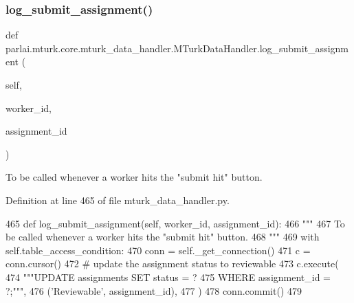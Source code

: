 \subsubsection{\texorpdfstring{log\+\_\+submit\+\_\+assignment()}{log\_submit\_assignment()}}
{\footnotesize\ttfamily def parlai.\+mturk.\+core.\+mturk\+\_\+data\+\_\+handler.\+M\+Turk\+Data\+Handler.\+log\+\_\+submit\+\_\+assignment (\begin{DoxyParamCaption}\item[{}]{self,  }\item[{}]{worker\+\_\+id,  }\item[{}]{assignment\+\_\+id }\end{DoxyParamCaption})}

\begin{DoxyVerb}To be called whenever a worker hits the "submit hit" button.
\end{DoxyVerb}
 

Definition at line 465 of file mturk\+\_\+data\+\_\+handler.\+py.


\begin{DoxyCode}
465     \textcolor{keyword}{def }log\_submit\_assignment(self, worker\_id, assignment\_id):
466         \textcolor{stringliteral}{"""}
467 \textcolor{stringliteral}{        To be called whenever a worker hits the "submit hit" button.}
468 \textcolor{stringliteral}{        """}
469         with self.table\_access\_condition:
470             conn = self.\_get\_connection()
471             c = conn.cursor()
472             \textcolor{comment}{# update the assignment status to reviewable}
473             c.execute(
474                 \textcolor{stringliteral}{"""UPDATE assignments SET status = ?}
475 \textcolor{stringliteral}{                         WHERE assignment\_id = ?;"""},
476                 (\textcolor{stringliteral}{'Reviewable'}, assignment\_id),
477             )
478             conn.commit()
479 
\end{DoxyCode}
\mbox{\label{classparlai_1_1mturk_1_1core_1_1mturk__data__handler_1_1MTurkDataHandler_a080c2ffbf861cfe6175491a7a0bdd0ce}} 
